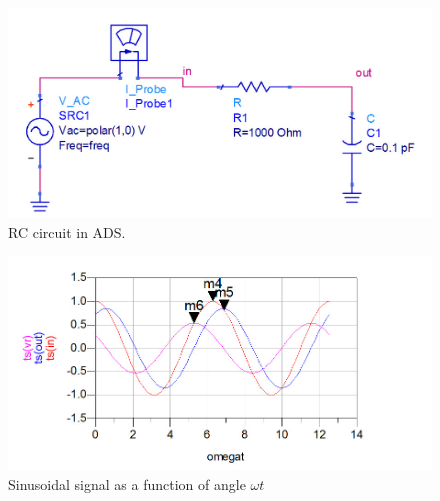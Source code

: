 \documentclass{ximera}
\begin{document}
\begin{example}
\begin{explanation}
\begin{figure}[htbp]
\begin{center}
\includegraphics[scale=0.2]{../jpg/RCcircADS.jpg}
\end{center}
\caption{\label{RCcircADS} RC circuit in ADS.}
\end{figure}


\begin{figure}[htbp]
\begin{center}
\includegraphics[scale=0.3]{../jpg/voltagesinRCcircRadADS}
\end{center}
\caption{\label{SSangle} Sinusoidal signal as a function of angle $\omega t$}
\end{figure}



\end{explanation}
\end{example}
\end{document}
